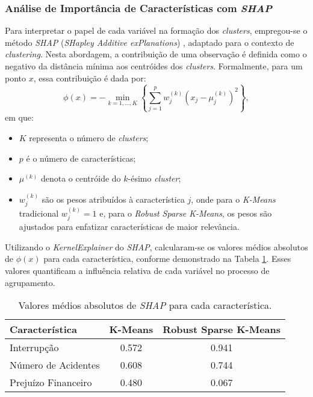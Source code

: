 \documentclass[conference]{IEEEtran}
\begin{document}
\subsubsection{Análise de Importância de Características com \textit{SHAP}}
Para interpretar o papel de cada variável na formação dos \textit{clusters}, empregou-se o método \textit{SHAP} (\textit{SHapley Additive exPlanations}) \cite{lundberg2017unified}, adaptado para o contexto de \textit{clustering}. Nesta abordagem, a contribuição de uma observação é definida como o negativo da distância mínima aos centróides dos \textit{clusters}. Formalmente, para um ponto \(x\), essa contribuição é dada por:
\[
\phi(x) = -\min_{k=1,\dots,K} \left\{ \sum_{j=1}^{p} w_{j}^{(k)} \left(x_j - \mu_{j}^{(k)}\right)^2 \right\},
\]
em que:
\begin{itemize}
    \item \(K\) representa o número de \textit{clusters};
    \item \(p\) é o número de características;
    \item \(\mu^{(k)}\) denota o centróide do \(k\)-ésimo \textit{cluster};
    \item \(w_{j}^{(k)}\) são os pesos atribuídos à característica \(j\), onde para o \textit{K-Means} tradicional \(w_{j}^{(k)}=1\) e, para o \textit{Robust Sparse K-Means}, os pesos são ajustados para enfatizar características de maior relevância.
\end{itemize}

Utilizando o \textit{KernelExplainer} do \textit{SHAP}, calcularam-se os valores médios absolutos de \(\phi(x)\) para cada característica, conforme demonstrado na Tabela \ref{tab:shap_comparison}. Esses valores quantificam a influência relativa de cada variável no processo de agrupamento.

\begin{table}[!htb]
    \centering
    \begin{tabular}{|l|c|c|}
        \hline
        \textbf{Característica} & \textbf{K-Means} & \textbf{Robust Sparse K-Means} \\
        \hline
        Interrupção & 0.572 & 0.941 \\
        Número de Acidentes & 0.608 & 0.744 \\
        Prejuízo Financeiro & 0.480 & 0.067 \\
        \hline
    \end{tabular}
    \caption{Valores médios absolutos de \textit{SHAP} para cada característica.}
    \label{tab:shap_comparison}
\end{table}
\end{document}
